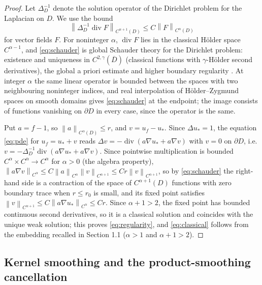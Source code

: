 \documentclass[11pt]{article}
\numberwithin{equation}{section}
\newcommand{\norm}[1]{\left\|#1\right\|}
\newcommand{\diver}{\operatorname{div}}
\begin{document}
\begin{proof}
Let $\Delta_D^{-1}$ denote the solution operator of the Dirichlet
problem for the Laplacian on $D$. We use the bound
\begin{equation}\label{eq:schauder}
 \norm{\Delta_D^{-1}\diver F}_{C^{\alpha+1}(D)}\le C\norm F_{C^\alpha(D)}
\end{equation}
for vector fields $F$. For noninteger $\alpha$, $\diver F$ lies in the
classical H\"older space $C^{\alpha-1}$, and \eqref{eq:schauder} is
global Schauder theory for the Dirichlet problem: existence and
uniqueness in $C^{2,\gamma}(\overline D)$ (classical functions with
$\gamma$-H\"older second derivatives), the global a priori estimate
and higher boundary regularity \cite[Theorems 6.14, 6.6 and 6.19]{GT}.
At integer $\alpha$ the same linear operator is bounded between the
spaces with two neighbouring noninteger indices, and real interpolation
of H\"older--Zygmund spaces on smooth domains
\cite[Sections 1.6, 4.5 and 5.1--5.2]{Triebel} gives
\eqref{eq:schauder} at the endpoint; the image consists of functions
vanishing on $\partial D$ in every case, since the operator is the same.

Put $a=f-1$, so $\norm a_{C^\alpha(D)}\le r$, and $v=u_f-u_*$. Since
$\Delta u_*=1$, the equation \eqref{eq:pde} for $u_f=u_*+v$ reads
$\Delta v=-\diver(a\nabla u_*+a\nabla v)$ with $v=0$ on $\partial D$,
i.e. $v=-\Delta_D^{-1}\diver(a\nabla u_*+a\nabla v)$. Since pointwise
multiplication is bounded $C^\alpha\times C^\alpha\to C^\alpha$ for
$\alpha>0$ (the algebra property),
$\norm{a\nabla v}_{C^\alpha}\le C\norm a_{C^\alpha}\norm{v}_{C^{\alpha+1}}
\le Cr\norm v_{C^{\alpha+1}}$, so by \eqref{eq:schauder} the right-hand
side is a contraction of the space of $C^{\alpha+1}(D)$ functions with
zero boundary trace when $r\le r_0$ is small, and its fixed point
satisfies $\norm v_{C^{\alpha+1}}\le C\norm{a\nabla u_*}_{C^\alpha}\le
Cr$. Since $\alpha+1>2$, the fixed point has bounded continuous second
derivatives, so it is a classical solution and coincides with the
unique weak solution; this proves
\eqref{eq:regularity}, and \eqref{eq:classical} follows from the
embedding recalled in Section 1.1 ($\alpha>1$ and $\alpha+1>2$).
\end{proof}


\subsection{Kernel smoothing and the product-smoothing cancellation}\label{sec:smoothing}
\end{document}
